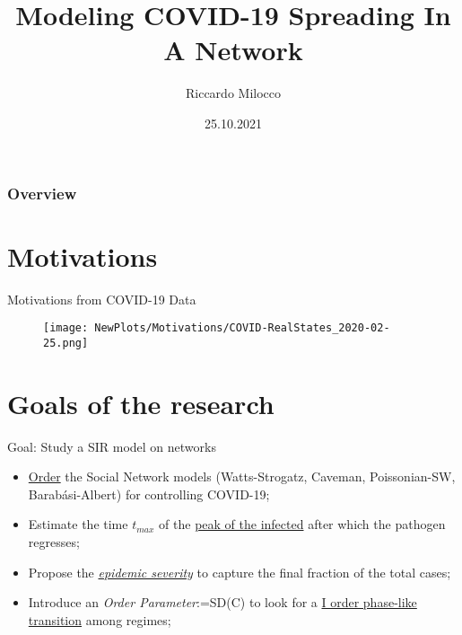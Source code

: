 \documentclass[xcolor={dvipsnames}, aspectratio = 43]{beamer}
\title[COVID-19 in Networks]{Modeling COVID-19 Spreading In A Network} %
\author{Riccardo Milocco} %
\institute[DFA - UniPD] %
{
{\normalsize Prof./Dr. Marco Baiesi} \\
\vspace{1cm}
{\normalsize Università Degli Studi di Padova} \\ %
\medskip
{\normalsize Dipartimento di Fisica e Astronomia G. Galilei} %
}
\date{25.10.2021} %
\begin{document}
\begin{frame}
\titlepage %
\end{frame}

\begin{frame}
\frametitle{Overview} %
\tableofcontents %
\end{frame}

\section{Motivations}
\begin{frame}{Motivations from COVID-19 Data}
	\begin{figure}[h]
		\centering
		\texttt{[image: NewPlots/Motivations/COVID-RealStates\_2020-02-25.png]}
	\end{figure}
\end{frame}

\section{Goals of the research}
\begin{frame}{Goal: Study a SIR model on networks}
\centering
\begin{itemize}
	\item \underline{Order} the Social Network models (Watts-Strogatz, Caveman, Poissonian-SW, Barabási-Albert) for controlling COVID-19; \vfill
	\item Estimate the time $t_{max}$ of the \underline{peak of the infected} after which the pathogen regresses; \vfill
	\item Propose the \underline{\textit{epidemic severity}} to capture the final fraction of the total cases; \vfill
	\item Introduce an \textit{Order Parameter}:=SD(C) to look for a \underline{I order phase-like transition} among regimes; \vfill
\end{itemize}
\end{frame}
\end{document}
